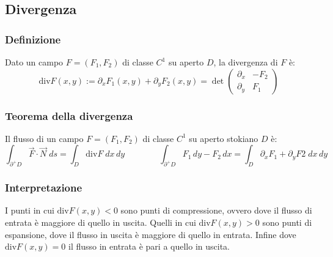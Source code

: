 \documentclass[a4paper]{article}
\newcommand\diver{\text{div}} %
\begin{document}
\subsection{Divergenza}
\subsubsection*{Definizione}
Dato un campo \(F = (F_1, F_2)\) di classe \(C^1\) su aperto \(D\), la divergenza di \(F\) è:
\[\diver F(x,y) := \partial_x F_1(x,y) + \partial_y F_2(x,y) = \det \left(\begin{matrix} \partial_x & -F_2 \\ \partial_y & F_1 \end{matrix}\right)\]

\subsubsection*{Teorema della divergenza}
Il flusso di un campo \(F = (F_1, F_2)\) di classe \(C^1\) su aperto stokiano \(D\) è:
\[\int_{\partial^+D} \vec{F} \cdot \vec{N} \; ds = \int_D \diver F \; dx \, dy \qquad\qquad \int_{\partial^+D} F_1 \, dy - F_2 \,dx = \int_D \partial_xF_1 + \partial_yF2 \; dx \, dy\]

\subsubsection*{Interpretazione}
I punti in cui \(\diver F(x,y) < 0\) sono punti di compressione, ovvero dove il flusso di entrata è maggiore di quello in uscita.
Quelli in cui \(\diver F(x,y) > 0\) sono punti di espansione, dove il flusso in uscita è maggiore di quello in entrata. Infine
dove \(\diver F(x,y) = 0\) il flusso in entrata è pari a quello in uscita.
\end{document}
